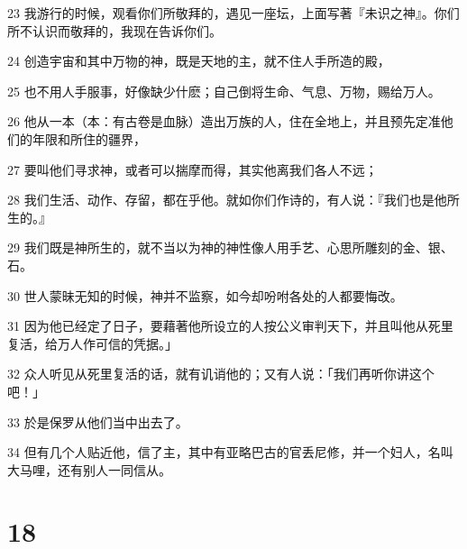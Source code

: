 \par 23 我游行的时候，观看你们所敬拜的，遇见一座坛，上面写著『未识之神』。你们所不认识而敬拜的，我现在告诉你们。
\par 24 创造宇宙和其中万物的神，既是天地的主，就不住人手所造的殿，
\par 25 也不用人手服事，好像缺少什麽；自己倒将生命、气息、万物，赐给万人。
\par 26 他从一本（本：有古卷是血脉）造出万族的人，住在全地上，并且预先定准他们的年限和所住的疆界，
\par 27 要叫他们寻求神，或者可以揣摩而得，其实他离我们各人不远；
\par 28 我们生活、动作、存留，都在乎他。就如你们作诗的，有人说：『我们也是他所生的。』
\par 29 我们既是神所生的，就不当以为神的神性像人用手艺、心思所雕刻的金、银、石。
\par 30 世人蒙昧无知的时候，神并不监察，如今却吩咐各处的人都要悔改。
\par 31 因为他已经定了日子，要藉著他所设立的人按公义审判天下，并且叫他从死里复活，给万人作可信的凭据。」
\par 32 众人听见从死里复活的话，就有讥诮他的；又有人说：「我们再听你讲这个吧！」
\par 33 於是保罗从他们当中出去了。
\par 34 但有几个人贴近他，信了主，其中有亚略巴古的官丢尼修，并一个妇人，名叫大马哩，还有别人一同信从。

\chapter{18}

